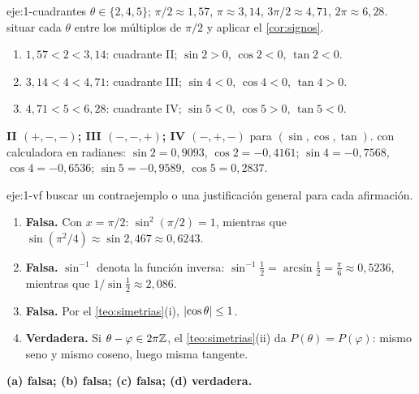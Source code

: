 \begin{solucion}{eje:1-cuadrantes}
\datos $\theta\in\{2,4,5\}$; $\pi/2\approx1{,}57$, $\pi\approx3{,}14$, $3\pi/2\approx4{,}71$, $2\pi\approx6{,}28$.
\planteamiento situar cada $\theta$ entre los múltiplos de $\pi/2$ y aplicar el \cref{cor:signos}.
\pasos
\begin{enumerate}[label=\arabic*.]
  \item $1{,}57<2<3{,}14$: cuadrante II; $\sin2>0$, $\cos2<0$, $\tan2<0$.
  \item $3{,}14<4<4{,}71$: cuadrante III; $\sin4<0$, $\cos4<0$, $\tan4>0$.
  \item $4{,}71<5<6{,}28$: cuadrante IV; $\sin5<0$, $\cos5>0$, $\tan5<0$.
\end{enumerate}
\resultado \textbf{II $(+,-,-)$; III $(-,-,+)$; IV $(-,+,-)$} para $(\sin,\cos,\tan)$.
\comprobacion con calculadora en radianes: $\sin2=0{,}9093$, $\cos2=-0{,}4161$; $\sin4=-0{,}7568$, $\cos4=-0{,}6536$; $\sin5=-0{,}9589$, $\cos5=0{,}2837$.
\end{solucion}

\begin{solucion}{eje:1-vf}
\planteamiento buscar un contraejemplo o una justificación general para cada afirmación.
\pasos
\begin{enumerate}[label=(\alph*)]
  \item \textbf{Falsa.} Con $x=\pi/2$: $\sin^{2}(\pi/2)=1$, mientras que $\sin(\pi^{2}/4)\approx\sin2{,}467\approx0{,}6243$.
  \item \textbf{Falsa.} $\sin^{-1}$ denota la función inversa: $\sin^{-1}\frac12=\arcsin\frac12=\frac{\pi}{6}\approx0{,}5236$, mientras que $1/\sin\frac12\approx2{,}086$.
  \item \textbf{Falsa.} Por el \cref{teo:simetrias}(i), $\lvert\cos\theta\rvert\le1$.
  \item \textbf{Verdadera.} Si $\theta-\varphi\in2\pi\mathbb{Z}$, el \cref{teo:simetrias}(ii) da $P(\theta)=P(\varphi)$: mismo seno y mismo coseno, luego misma tangente.
\end{enumerate}
\resultado \textbf{(a) falsa; (b) falsa; (c) falsa; (d) verdadera.}
\end{solucion}

